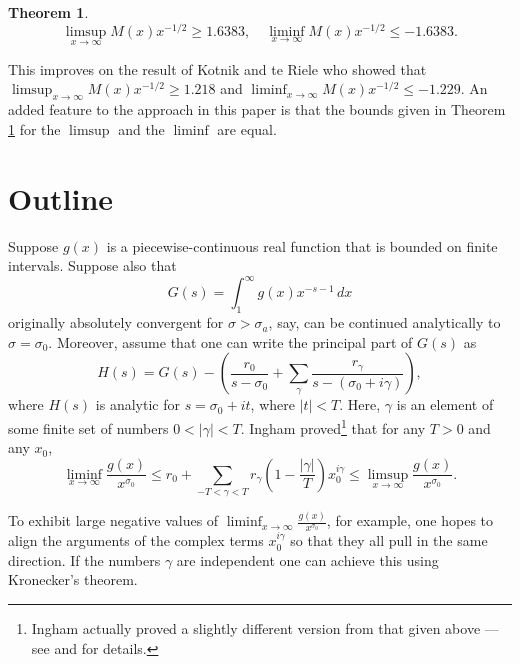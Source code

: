 \documentclass{article}
\newtheorem{theorem}{Theorem}
\numberwithin{equation}{section}
\begin{document}
\begin{theorem}\label{Ours}
\begin{equation*}
\limsup_{x\rightarrow\infty} M(x) x^{-1/2} \geq 1.6383, \quad \liminf_{x\rightarrow\infty} M(x) x^{-1/2} \leq -1.6383.
\end{equation*}
\end{theorem}

This improves on the result of Kotnik and te Riele \cite{Kotte} who showed that $\limsup_{x\rightarrow\infty} M(x) x^{-1/2} \geq 1.218$ and $\liminf_{x\rightarrow\infty} M(x) x^{-1/2} \leq -1.229$. An added feature to the approach in this paper is that the bounds given in Theorem \ref{Ours} for the $\limsup$ and the $\liminf$ are equal. 

\section{Outline}

Suppose $g(x)$ is a piecewise-continuous real function that is bounded on finite intervals. Suppose also that
\begin{equation}\label{bigg}
G(s) = \int_{1}^{\infty} g(x) x^{-s-1}\, dx
\end{equation}
originally absolutely convergent for $\sigma > \sigma_{a}$, say, can be continued analytically to $\sigma = \sigma_{0}$. Moreover, assume that one can write the principal part of $G(s)$ as
\begin{equation}\label{bigg2}
H(s) = G(s) - \left( \frac{r_{0}}{s- \sigma_{0}} + \sum_{\gamma} \frac{r_{\gamma}}{s- (\sigma_{0} + i\gamma)}\right),
\end{equation}
where $H(s)$ is analytic for $s= \sigma_{0} + it$, where $|t|<T$. Here, $\gamma$ is an element of some finite set of numbers $0 < |\gamma| <T$. Ingham \cite[Thm 1]{Ingham1942} proved\footnote{Ingham actually proved a slightly different version from that given above --- see \cite{HaselP} and \cite[p.\ 86]{AndStark} for details.} that for any $T>0$ and any $x_{0}$,
\begin{equation}\label{InghamThm1}
\liminf_{x\rightarrow\infty} \frac{g(x)}{x^{\sigma_{0}}} \leq r_{0} + \sum_{-T < \gamma < T} r_{\gamma} \left(1- \frac{|\gamma|}{T}\right) x_{0}^{i\gamma} \leq \limsup_{x\rightarrow\infty} \frac{g(x)}{x^{\sigma_{0}}}.
\end{equation}

To exhibit large negative values of $\liminf_{x\rightarrow\infty} \frac{g(x)}{x^{\sigma_{0}}}$, for example, one hopes to align the arguments of the complex terms $x_{0}^{i\gamma}$ so that they all pull in the same direction. If the numbers $\gamma$ are independent one can achieve this using Kronecker's theorem.
\end{document}
